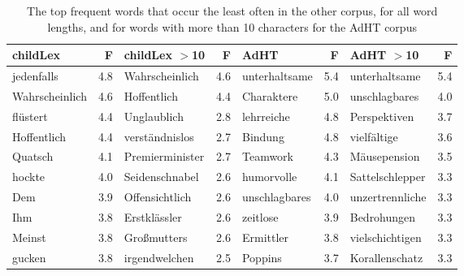 \documentclass[doc, a4paper, anonymous]{apa7}
\begin{document}
\begin{table}[!htbp]
\caption{The top frequent words that occur the least often in the other corpus, for all word lengths, and for words with more than 10 characters for the AdHT corpus}
\centering
\begin{tabular}{lrlrlrlr}
  \hline
childLex & F & childLex $>$10 & F & AdHT & F & AdHT $>$10 & F \\ 
  \hline
jedenfalls & 4.8 & Wahrscheinlich & 4.6 & unterhaltsame & 5.4 & unterhaltsame & 5.4 \\ 
  Wahrscheinlich & 4.6 & Hoffentlich & 4.4 & Charaktere & 5.0 & unschlagbares & 4.0 \\ 
  flüstert & 4.4 & Unglaublich & 2.8 & lehrreiche & 4.8 & Perspektiven & 3.7 \\ 
  Hoffentlich & 4.4 & verständnislos & 2.7 & Bindung & 4.8 & vielfältige & 3.6 \\ 
  Quatsch & 4.1 & Premierminister & 2.7 & Teamwork & 4.3 & Mäusepension & 3.5 \\ 
  hockte & 4.0 & Seidenschnabel & 2.6 & humorvolle & 4.1 & Sattelschlepper & 3.3 \\ 
  Dem & 3.9 & Offensichtlich & 2.6 & unschlagbares & 4.0 & unzertrennliche & 3.3 \\ 
  Ihm & 3.8 & Erstklässler & 2.6 & zeitlose & 3.9 & Bedrohungen & 3.3 \\ 
  Meinst & 3.8 & Großmutters & 2.6 & Ermittler & 3.8 & vielschichtigen & 3.3 \\ 
  gucken & 3.8 & irgendwelchen & 2.5 & Poppins & 3.7 & Korallenschatz & 3.3 \\ 
   \hline
\end{tabular}
\label{words-adht-low}
\end{table}
\end{document}
